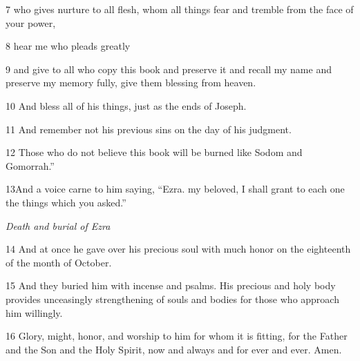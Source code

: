 \par 7 who gives nurture to all flesh, whom all things fear and tremble from the face of your power,

\par 8 hear me who pleads greatly 

\par 9 and give to all who copy this book and preserve it and recall my name and preserve my memory fully, give them blessing from heaven.

\par 10 And bless all of his things, just as the ends of Joseph.

\par 11 And remember not his previous sins on the day of his judgment. 

\par 12 Those who do not believe this book will be burned like Sodom and Gomorrah.” 

\par 13And a voice carne to him saying, “Ezra. my beloved, I shall grant to each one the things which you asked.”

\par \textit{Death and burial of Ezra}

\par 14 And at once he gave over his precious soul with much honor on the eighteenth of the month of October.

\par 15 And they buried him with incense and psalms. His precious and holy body provides unceasingly strengthening of souls and bodies for those who approach him willingly.

\par 16 Glory, might, honor, and worship to him for whom it is fitting, for the Father and the Son and the Holy Spirit, now and always and for ever and ever. Amen.

